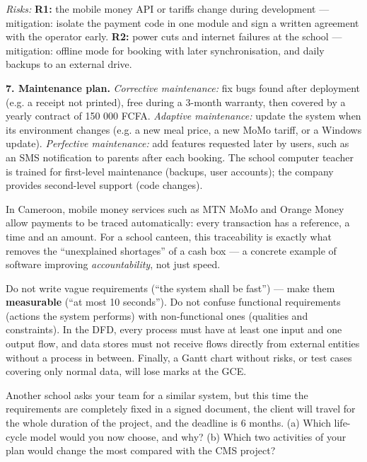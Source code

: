 \documentclass[11pt]{article}
\begin{document}
\emph{Risks:} \textbf{R1:} the mobile money API or tariffs change during development --- mitigation: isolate the payment code in one module and sign a written agreement with the operator early. \textbf{R2:} power cuts and internet failures at the school --- mitigation: offline mode for booking with later synchronisation, and daily backups to an external drive.

\textbf{7. Maintenance plan.} \emph{Corrective maintenance:} fix bugs found after deployment (e.g. a receipt not printed), free during a 3-month warranty, then covered by a yearly contract of 150 000 FCFA. \emph{Adaptive maintenance:} update the system when its environment changes (e.g. a new meal price, a new MoMo tariff, or a Windows update). \emph{Perfective maintenance:} add features requested later by users, such as an SMS notification to parents after each booking. The school computer teacher is trained for first-level maintenance (backups, user accounts); the company provides second-level support (code changes).

\begin{savaistu}
In Cameroon, mobile money services such as MTN MoMo and Orange Money allow payments to be traced automatically: every transaction has a reference, a time and an amount. For a school canteen, this traceability is exactly what removes the ``unexplained shortages'' of a cash box --- a concrete example of software improving \emph{accountability}, not just speed.
\end{savaistu}

\begin{attention}
Do not write vague requirements (``the system shall be fast'') --- make them \textbf{measurable} (``at most 10 seconds''). Do not confuse functional requirements (actions the system performs) with non-functional ones (qualities and constraints). In the DFD, every process must have at least one input and one output flow, and data stores must not receive flows directly from external entities without a process in between. Finally, a Gantt chart without risks, or test cases covering only normal data, will lose marks at the GCE.
\end{attention}

\begin{exercice}
Another school asks your team for a similar system, but this time the requirements are completely fixed in a signed document, the client will travel for the whole duration of the project, and the deadline is 6 months. (a) Which life-cycle model would you now choose, and why? (b) Which two activities of your plan would change the most compared with the CMS project?
\end{exercice}
\end{document}
